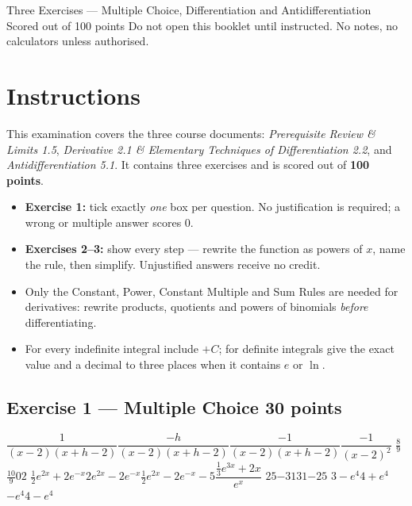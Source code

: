 \documentclass[11pt]{article}
\begin{document}
%
{Three Exercises --- Multiple Choice, Differentiation and Antidifferentiation\\ Scored out of 100 points}%
{Do not open this booklet until instructed. No notes, no calculators unless authorised.}

\section*{Instructions}
\studentbox
\bigskip
This examination covers the three course documents: \emph{Prerequisite Review \& Limits 1.5},
\emph{Derivative 2.1 \& Elementary Techniques of Differentiation 2.2}, and
\emph{Antidifferentiation 5.1}. It contains three exercises and is scored out of \textbf{100 points}.
\begin{itemize}[itemsep=2pt]
  \item \textbf{Exercise 1:} tick exactly \emph{one} box per question. No justification is required; a wrong or multiple answer scores 0.
  \item \textbf{Exercises 2--3:} show every step --- rewrite the function as powers of $x$, name the rule, then simplify. Unjustified answers receive no credit.
  \item Only the Constant, Power, Constant Multiple and Sum Rules are needed for derivatives: rewrite products, quotients and powers of binomials \emph{before} differentiating.
  \item For every indefinite integral include $+C$; for definite integrals give the exact value and a decimal to three places when it contains $e$ or $\ln$.
\end{itemize}
\scoretable

\newpage
\subsection*{Exercise 1 --- Multiple Choice \hfill {\normalsize\color{fnavy}30 points}}
\begin{enumerate}[label=\textbf{Q\arabic*.},leftmargin=*,itemsep=10pt]
  {$\dfrac{1}{(x-2)(x+h-2)}$}{$\dfrac{-h}{(x-2)(x+h-2)}$}{$\dfrac{-1}{(x-2)(x+h-2)}$}{$\dfrac{-1}{(x-2)^2}$}
  {$\tfrac89$}{$\tfrac{10}{9}$}{$0$}{$2$}
  {$\tfrac12 e^{2x}+2e^{-x}$}{$2e^{2x}-2e^{-x}$}{$\tfrac12 e^{2x}-2e^{-x}-5$}{$\dfrac{\frac13 e^{3x}+2x}{e^{x}}$}
  {$25$}{$-31$}{$31$}{$-25$}
  {$3-e^4$}{$4+e^4$}{$-e^4$}{$4-e^4$}
\end{enumerate}
\end{document}
